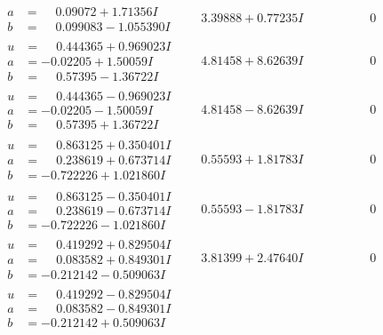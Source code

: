 \documentclass[1p]{elsarticle_modified}
\theoremstyle{definition}
\begin{document}
$$\begin{array}{c|c|c}
\begin{aligned}
a &= \phantom{-}0.09072 + 1.71356 I \\
b &= \phantom{-}0.099083 - 1.055390 I\end{aligned}
 & \phantom{-}3.39888 + 0.77235 I & \phantom{-0.000000 } 0 \\ \hline\begin{aligned}
u &= \phantom{-}0.444365 + 0.969023 I \\
a &= -0.02205 + 1.50059 I \\
b &= \phantom{-}0.57395 - 1.36722 I\end{aligned}
 & \phantom{-}4.81458 + 8.62639 I & \phantom{-0.000000 } 0 \\ \hline\begin{aligned}
u &= \phantom{-}0.444365 - 0.969023 I \\
a &= -0.02205 - 1.50059 I \\
b &= \phantom{-}0.57395 + 1.36722 I\end{aligned}
 & \phantom{-}4.81458 - 8.62639 I & \phantom{-0.000000 } 0 \\ \hline\begin{aligned}
u &= \phantom{-}0.863125 + 0.350401 I \\
a &= \phantom{-}0.238619 + 0.673714 I \\
b &= -0.722226 + 1.021860 I\end{aligned}
 & \phantom{-}0.55593 + 1.81783 I & \phantom{-0.000000 } 0 \\ \hline\begin{aligned}
u &= \phantom{-}0.863125 - 0.350401 I \\
a &= \phantom{-}0.238619 - 0.673714 I \\
b &= -0.722226 - 1.021860 I\end{aligned}
 & \phantom{-}0.55593 - 1.81783 I & \phantom{-0.000000 } 0 \\ \hline\begin{aligned}
u &= \phantom{-}0.419292 + 0.829504 I \\
a &= \phantom{-}0.083582 + 0.849301 I \\
b &= -0.212142 - 0.509063 I\end{aligned}
 & \phantom{-}3.81399 + 2.47640 I & \phantom{-0.000000 } 0 \\ \hline\begin{aligned}
u &= \phantom{-}0.419292 - 0.829504 I \\
a &= \phantom{-}0.083582 - 0.849301 I \\
b &= -0.212142 + 0.509063 I\end{aligned}

\end{array}$$
\end{document}
